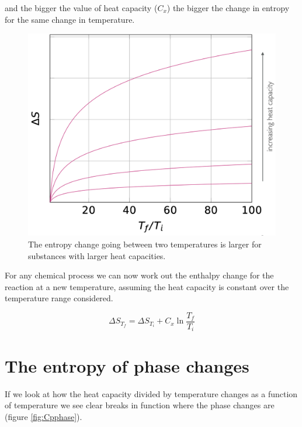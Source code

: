 \documentclass[
]{book}
\begin{document}
and the bigger the value of heat capacity (\(C_x\)) the bigger the change in entropy for the same change in temperature.

\begin{figure}

{\centering \includegraphics[width=0.8\linewidth]{images/entropyheatcapacity} 

}

\caption{The entropy change going between two temperatures is larger for substances with larger heat capacities.}\label{fig:entropyheatcapacity}
\end{figure}

For any chemical process we can now work out the enthalpy change for the reaction at a new temperature, assuming the heat capacity is constant over the temperature range considered.

\begin{equation}
\Delta S_{T_f} = \Delta S_{T_i} + C_x \ln \frac{T_f}{T_i}
\label{eq:entropyrxntemp}
\end{equation}

\hypertarget{the-entropy-of-phase-changes}{%
\section{The entropy of phase changes}\label{the-entropy-of-phase-changes}}

If we look at how the heat capacity divided by temperature changes as a function of temperature we see clear breaks in function where the phase changes are (figure \ref{fig:Cpphase}).
\end{document}
